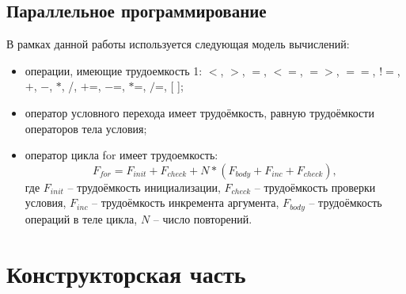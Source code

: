 \documentclass[12pt, a4paper]{report}
\begin{document}
	\section{Параллельное программирование}
	В рамках данной работы используется следующая модель вычислений:
	\begin{itemize}
		\item операции, имеющие трудоемкость 1: $<$, $>$, $=$, $<=$, $=>$, $==$, $!=$,$+$, $-$, $\ast$, /, $+$=, $-$=, $\ast$=, $/$=, [ ];
		\item оператор условного перехода имеет трудоёмкость, равную трудоёмкости операторов тела условия;
		\item оператор цикла for имеет трудоемкость:
		\begin{equation}
		\label{for_cost}
		F_{for} = F_{init} + F_{check} + N \ast (F_{body} + F_{inc} + F_{check}),
		\end{equation}
		где $F_{init}$ -- трудоёмкость инициализации, $F_{check}$ -- трудоёмкость проверки условия, $F_{inc}$ -- трудоёмкость инкремента аргумента, $F_{body}$ -- трудоёмкость операций в теле цикла, $N$ -- число повторений. ~\cite{AlgAnalysis}
	\end{itemize} 
	

	\chapter{Конструкторская часть}
	
\end{document}
